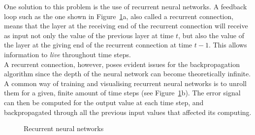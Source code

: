One solution to this problem is the use of recurrent neural networks.
A feedback loop such as the one shown in Figure~\ref{fig:rnn}a, also called
a recurrent connection, means that the layer at the receiving end of the
recurrent connection will receive as input not only the value of the previous
layer at time $t$, but also the value of the layer at the giving end of the 
recurrent connection at time $t-1$. This allows information to \textit{live}
throughout time steps.\\

A recurrent connection, however, poses evident issues for the backpropagation
algorithm since the depth of the neural network can become theoretically
infinite.  A common way of training and visualising recurrent neural networks 
is to unroll them for a given, finite amount of time steps (see 
Figure~\ref{fig:rnn}b).  The error signal can then be computed
for the output value at each time step, and backpropagated through all the
previous input values that affected its computing.\\
\begin{figure}[]
	\centering
	\qquad
	\caption{Recurrent neural networks}
	\label{fig:rnn}
\end{figure}


